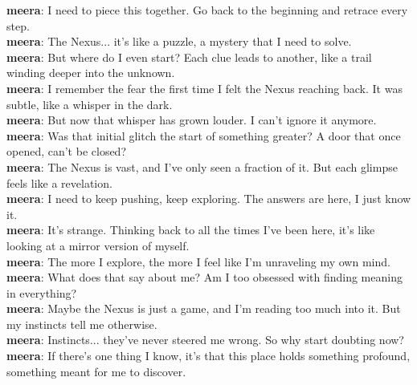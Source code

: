 \documentclass[12pt]{book}
\begin{document}
\textbf{meera}: I need to piece this together. Go back to the beginning and retrace every step.\\

\textbf{meera}: The Nexus... it's like a puzzle, a mystery that I need to solve.\\

\textbf{meera}: But where do I even start? Each clue leads to another, like a trail winding deeper into the unknown.\\

\textbf{meera}: I remember the fear the first time I felt the Nexus reaching back. It was subtle, like a whisper in the dark.\\

\textbf{meera}: But now that whisper has grown louder. I can't ignore it anymore.\\

\textbf{meera}: Was that initial glitch the start of something greater? A door that once opened, can't be closed?\\

\textbf{meera}: The Nexus is vast, and I've only seen a fraction of it. But each glimpse feels like a revelation.\\

\textbf{meera}: I need to keep pushing, keep exploring. The answers are here, I just know it.\\

\textbf{meera}: It's strange. Thinking back to all the times I've been here, it's like looking at a mirror version of myself.\\

\textbf{meera}: The more I explore, the more I feel like I'm unraveling my own mind.\\

\textbf{meera}: What does that say about me? Am I too obsessed with finding meaning in everything?\\

\textbf{meera}: Maybe the Nexus is just a game, and I'm reading too much into it. But my instincts tell me otherwise.\\

\textbf{meera}: Instincts... they've never steered me wrong. So why start doubting now?\\

\textbf{meera}: If there's one thing I know, it's that this place holds something profound, something meant for me to discover.\\
\end{document}
